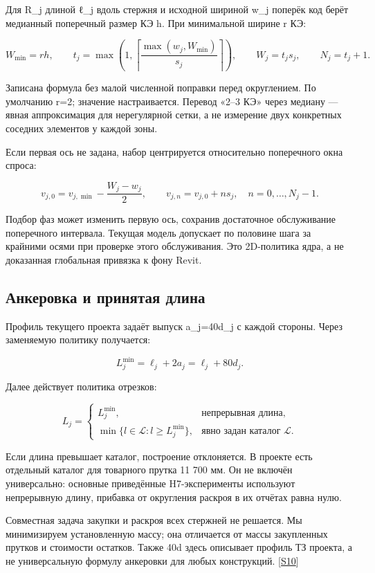 \documentclass[11pt,a4paper]{article}
\begin{document}
Для R\_j длиной ℓ\_j вдоль стержня и исходной шириной w\_j поперёк код берёт медианный поперечный размер КЭ h. При минимальной ширине r КЭ:


\[
W_{\min}=r h,\qquad
t_j=\max\!\left(1,\left\lceil\frac{\max(w_j,W_{\min})}{s_j}\right\rceil\right),
\qquad W_j=t_j s_j,\qquad N_j=t_j+1.
\]

Записана формула без малой численной поправки перед округлением. По умолчанию r=2; значение настраивается. Перевод «2–3 КЭ» через медиану — явная аппроксимация для нерегулярной сетки, а не измерение двух конкретных соседних элементов у каждой зоны.


Если первая ось не задана, набор центрируется относительно поперечного окна спроса:


\[
v_{j,0}=v_{j,\min}-\frac{W_j-w_j}{2},\qquad
v_{j,n}=v_{j,0}+n s_j,\quad n=0,\ldots,N_j-1.
\]

Подбор фаз может изменить первую ось, сохранив достаточное обслуживание поперечного интервала. Текущая модель допускает по половине шага за крайними осями при проверке этого обслуживания. Это 2D-политика ядра, а не доказанная глобальная привязка к фону Revit.


\subsection{Анкеровка и принятая длина}

Профиль текущего проекта задаёт выпуск a\_j=40d\_j с каждой стороны. Через заменяемую политику получается:


\[
L_j^{\min}=\ell_j+2a_j=\ell_j+80d_j.
\]

Далее действует политика отрезков:


\[
L_j=\begin{cases}
L_j^{\min},&\text{непрерывная длина},\\
\min\{l\in\mathcal L:l\ge L_j^{\min}\},&\text{явно задан каталог }\mathcal L.
\end{cases}
\]

Если длина превышает каталог, построение отклоняется. В проекте есть отдельный каталог для товарного прутка 11 700 мм. Он не включён универсально: основные приведённые H7-эксперименты используют непрерывную длину, прибавка от округления раскроя в их отчётах равна нулю.


Совместная задача закупки и раскроя всех стержней не решается. Мы минимизируем установленную массу; она отличается от массы закупленных прутков и стоимости остатков. Также 40d здесь описывает профиль ТЗ проекта, а не универсальную формулу анкеровки для любых конструкций. {\color{Teal}\small[\hyperlink{S10}{S10}]}
\end{document}
